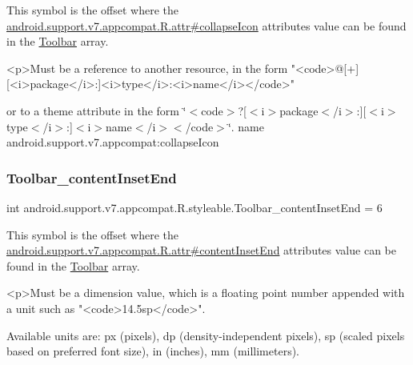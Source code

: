 This symbol is the offset where the \hyperlink{classandroid_1_1support_1_1v7_1_1appcompat_1_1R_1_1attr_a8a292560ceb637b93ed32829f1aa456d}{android.\+support.\+v7.\+appcompat.\+R.\+attr\#collapse\+Icon} attribute\textquotesingle{}s value can be found in the \hyperlink{classandroid_1_1support_1_1v7_1_1appcompat_1_1R_1_1styleable_a2daba9587ef9f700f2d54cf13435cb32}{Toolbar} array.

\begin{DoxyVerb}      <p>Must be a reference to another resource, in the form "<code>@[+][<i>package</i>:]<i>type</i>:<i>name</i></code>"
\end{DoxyVerb}
 or to a theme attribute in the form \char`\"{}$<$code$>$?\mbox{[}$<$i$>$package$<$/i$>$\+:\mbox{]}\mbox{[}$<$i$>$type$<$/i$>$\+:\mbox{]}$<$i$>$name$<$/i$>$$<$/code$>$\char`\"{}.  name android.\+support.\+v7.\+appcompat\+:collapse\+Icon \mbox{\label{classandroid_1_1support_1_1v7_1_1appcompat_1_1R_1_1styleable_a77f3e7561dfc11958910a87c4ffaf5be}} 
\subsubsection{\texorpdfstring{Toolbar\+\_\+content\+Inset\+End}{Toolbar\_contentInsetEnd}}
{\footnotesize\ttfamily int android.\+support.\+v7.\+appcompat.\+R.\+styleable.\+Toolbar\+\_\+content\+Inset\+End = 6\hspace{0.3cm}{\ttfamily [static]}}

This symbol is the offset where the \hyperlink{classandroid_1_1support_1_1v7_1_1appcompat_1_1R_1_1attr_a0de2c511147e44102ccb77312c667d73}{android.\+support.\+v7.\+appcompat.\+R.\+attr\#content\+Inset\+End} attribute\textquotesingle{}s value can be found in the \hyperlink{classandroid_1_1support_1_1v7_1_1appcompat_1_1R_1_1styleable_a2daba9587ef9f700f2d54cf13435cb32}{Toolbar} array.

\begin{DoxyVerb}      <p>Must be a dimension value, which is a floating point number appended with a unit such as "<code>14.5sp</code>".
\end{DoxyVerb}
 Available units are\+: px (pixels), dp (density-\/independent pixels), sp (scaled pixels based on preferred font size), in (inches), mm (millimeters). 


